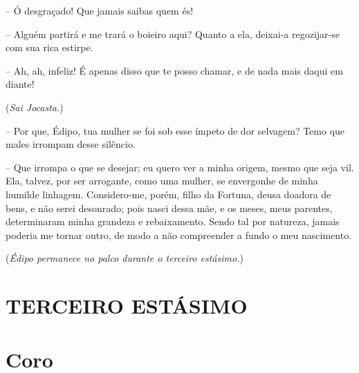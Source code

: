  --   Ó desgraçado! Que jamais saibas quem és!

 --    Alguém partirá e me trará o boieiro aqui? Quanto a ela, deixai-a
regozijar-se com sua rica estirpe.

 --   Ah, ah, infeliz! É apenas disso que te posso chamar, e de nada mais
daqui em diante!

(\emph{Sai Jocasta.})

 --   Por que, Édipo, tua mulher se foi sob esse ímpeto de dor selvagem? Temo
que males irrompam desse silêncio.

 --   Que irrompa o que se desejar; eu quero ver a minha origem, mesmo que
seja vil. Ela, talvez, por ser arrogante, como uma mulher, se envergonhe
de minha humilde  linhagem. Considero-me, porém, filho da Fortuna,
deusa doadora de bens, e não serei desonrado; pois nasci dessa mãe, e os
meses, meus parentes, determinaram minha grandeza e rebaixamento. Sendo
tal por natureza, jamais poderia me tornar outro, de modo a não
compreender a fundo o meu nascimento.

(\emph{Édipo permanece no palco durante o terceiro estásimo.})

\section{TERCEIRO ESTÁSIMO}


\section{Coro} 

